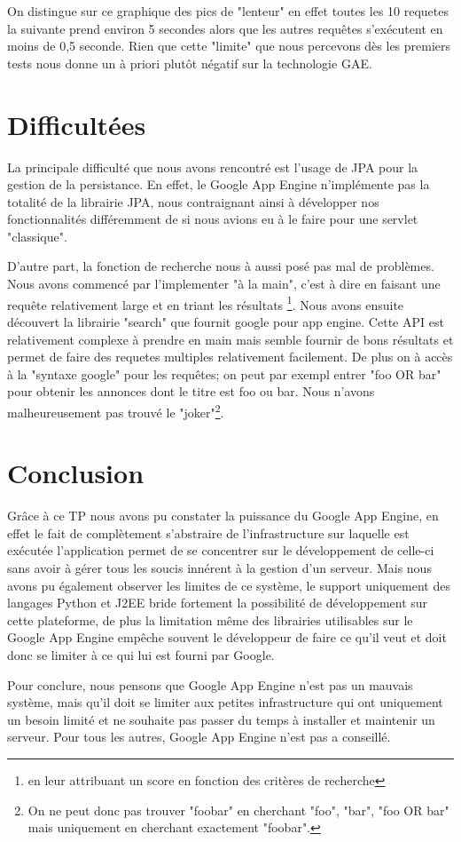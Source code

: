 \documentclass{article}
\begin{document}
On distingue sur ce graphique des pics de "lenteur" en effet toutes les 10 requetes la suivante prend environ 5 secondes alors que les autres requêtes s'exécutent en moins de 0,5 seconde. Rien que cette "limite" que nous percevons dès les premiers tests nous donne un à priori plutôt négatif sur la technologie GAE.

\section{Difficultées}
La principale difficulté que nous avons rencontré est l'usage de JPA pour la gestion de la persistance. En effet, le Google App Engine n'implémente pas la totalité de la librairie JPA, nous contraignant ainsi à développer nos fonctionnalités différemment de si nous avions eu à le faire pour une servlet "classique". 

D'autre part, la fonction de recherche nous à aussi posé pas mal de problèmes. Nous avons commencé par l'implementer "à la main", c'est à dire en faisant une requête relativement large et en triant les résultats \footnote{en leur attribuant un score en fonction des critères de recherche}. Nous avons ensuite découvert la librairie "search" que fournit google pour app engine. Cette API est relativement complexe à prendre en main mais semble fournir de bons résultats et permet de faire des requetes multiples relativement facilement. De plus on à accès à la "syntaxe google" pour les requêtes; on peut par exempl entrer "foo OR bar" pour obtenir les annonces dont le titre est foo ou bar. Nous n'avons malheureusement pas trouvé le "joker"\footnote{On ne peut donc pas trouver "foobar" en cherchant "foo", "bar", "foo OR bar" mais uniquement en cherchant exactement "foobar".}.


\section{Conclusion}
Grâce à ce TP nous avons pu constater la puissance du Google App Engine, en effet le fait de complètement s'abstraire de l'infrastructure sur laquelle est exécutée l'application permet de se concentrer sur le développement de celle-ci sans avoir à gérer tous les soucis innérent à la gestion d'un serveur. Mais nous avons pu également observer les limites de ce système, le support uniquement des langages Python et J2EE bride fortement la possibilité de développement sur cette plateforme, de plus la limitation même des librairies utilisables sur le Google App Engine empêche souvent le développeur de faire ce qu'il veut et doit donc se limiter à ce qui lui est fourni par Google.

Pour conclure, nous pensons que Google App Engine n'est pas un mauvais système, mais qu'il doit se limiter aux petites infrastructure qui ont uniquement un besoin limité et ne souhaite pas passer du temps à installer et maintenir un serveur. Pour tous les autres, Google App Engine n'est pas a conseillé.
\end{document}
